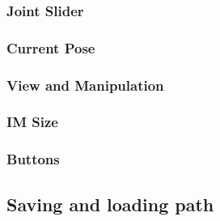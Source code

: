 \subsubsection{Joint Slider}
\label{subsubsec:web-ui-joint-slider}

\subsubsection{Current Pose}
\label{subsubsec:web-ui-current-pose}

\subsubsection{View and Manipulation}
\label{subsubsec:web-ui-view-manipulation}

\subsubsection{IM Size}
\label{subsubsec:web-ui-im-size}


\subsubsection{Buttons}
\label{subsubsec:web-ui-buttons}

\subsection{Saving and loading path}
\label{subsec:web-ui-saving-path}

